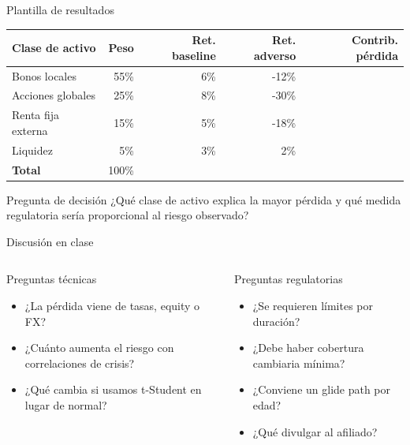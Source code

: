 \documentclass[aspectratio=169,11pt]{beamer}
\begin{document}
\begin{frame}{Plantilla de resultados}
\begin{table}
\centering
\scriptsize
\begin{tabular}{lrrrr}
\toprule
\textbf{Clase de activo} & \textbf{Peso} & \textbf{Ret. baseline} & \textbf{Ret. adverso} & \textbf{Contrib. pérdida} \\
\midrule
Bonos locales & 55\% & 6\% & -12\% &  \\
Acciones globales & 25\% & 8\% & -30\% &  \\
Renta fija externa & 15\% & 5\% & -18\% &  \\
Liquidez & 5\% & 3\% & 2\% &  \\
\midrule
\textbf{Total} & 100\% & & & \\
\bottomrule
\end{tabular}
\end{table}

\begin{block}{Pregunta de decisión}
¿Qué clase de activo explica la mayor pérdida y qué medida regulatoria sería proporcional al riesgo observado?
\end{block}
\end{frame}

\begin{frame}{Discusión en clase}
\begin{columns}[T]
\begin{block}{Preguntas técnicas}
\begin{itemize}
  \item ¿La pérdida viene de tasas, equity o FX?
  \item ¿Cuánto aumenta el riesgo con correlaciones de crisis?
  \item ¿Qué cambia si usamos t-Student en lugar de normal?
\end{itemize}
\end{block}

\begin{block}{Preguntas regulatorias}
\begin{itemize}
  \item ¿Se requieren límites por duración?
  \item ¿Debe haber cobertura cambiaria mínima?
  \item ¿Conviene un glide path por edad?
  \item ¿Qué divulgar al afiliado?
\end{itemize}
\end{block}
\end{columns}
\end{frame}
\end{document}
